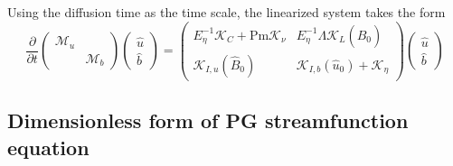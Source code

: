 Using the diffusion time as the time scale, the linearized system takes the form
\begin{equation}
    \frac{\partial}{\partial t} \begin{pmatrix} \mathcal{M}_u & \\ & \mathcal{M}_b \end{pmatrix}
    \begin{pmatrix} \hat{u} \\ \hat{b} \end{pmatrix} = 
    \begin{pmatrix}
        E_\eta^{-1} \mathcal{K}_C + \mathrm{Pm} \mathcal{K}_\nu & E_\eta^{-1} \Lambda \mathcal{K}_{L}(\hat{B}_0) \\ 
        \mathcal{K}_{I,u}(\hat{B}_0) & \mathcal{K}_{I,b}(\hat{u}_0) + \mathcal{K}_\eta
    \end{pmatrix}
    \begin{pmatrix} \hat{u} \\ \hat{b} \end{pmatrix}
\end{equation}


\subsection{Dimensionless form of PG streamfunction equation}

